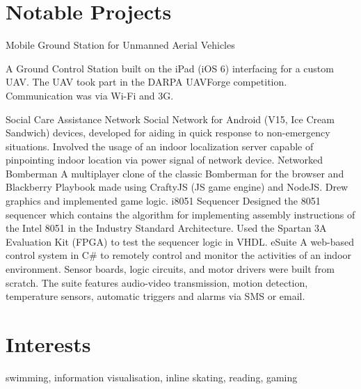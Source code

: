 \documentclass[]{friggeri-cv}
\begin{document}
\section{Notable Projects}
\begin{entrylist}
	{Mobile Ground Station for Unmanned Aerial Vehicles}
	{}
	{
		A Ground Control Station built on the iPad (iOS 6) interfacing for a custom UAV. The UAV took part in the DARPA UAVForge competition. Communication was via Wi-Fi and 3G.

	}
	{Social Care Assistance Network}
	{}
	{Social Network for Android (V15, Ice Cream Sandwich) devices, developed for aiding in quick response to non-emergency situations. Involved the usage of an indoor localization server capable of pinpointing indoor location via power signal of network device.}
	{Networked Bomberman}
	{}
	{A multiplayer clone of the classic Bomberman for the browser and Blackberry Playbook made using CraftyJS (JS game engine) and NodeJS. Drew graphics and implemented game logic. }
	{i8051 Sequencer}
	{}
	{Designed the 8051 sequencer which contains the algorithm for implementing assembly instructions of the Intel 8051 in the Industry Standard Architecture. Used the Spartan 3A Evaluation Kit (FPGA) to test the sequencer logic in VHDL.}
	{eSuite}
	{}
	{A web-based control system in C\# to remotely control and monitor the activities of an indoor environment. Sensor boards, logic circuits, and motor drivers were built from scratch. The suite features audio-video transmission, motion detection, temperature sensors, automatic triggers and alarms via SMS or email.}

\end{entrylist}



%
%	
\section{Interests}
swimming, information visualisation, inline skating, reading, gaming
\end{document}

